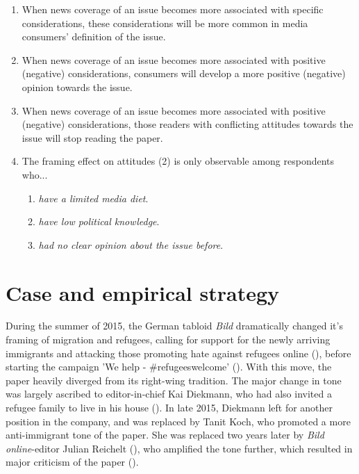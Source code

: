 \documentclass{article}
\begin{document}
\begin{enumerate}
    \item{When news coverage of an issue becomes more associated with specific considerations, these considerations will be more common in media consumers' definition of the issue.}
    \item{When news coverage of an issue becomes more associated with positive (negative) considerations, consumers will develop a more positive (negative) opinion towards the issue.}
    \item{When news coverage of an issue becomes more associated with positive (negative) considerations, those readers with conflicting attitudes towards the issue will stop reading the paper.}
    \item{The framing effect on attitudes (2) is only observable among respondents who...}
    \begin{enumerate}
        \item{\textit{have a limited media diet}.}
        \item{\textit{have low political knowledge}.}
        \item{\textit{had no clear opinion about the issue before}.}
    \end{enumerate}
\end{enumerate}


\section{Case and empirical strategy}


During the summer of 2015, the German tabloid \textit{Bild} dramatically changed it's framing of migration and refugees, calling for support for the newly arriving immigrants and attacking those promoting hate against refugees online (\cite{Bild2015Pranger, TagesspiegelBildPranger}), before starting the campaign 'We help - \#refugeeswelcome' (\cite{BildRefugeesWelcome}). With this move, the paper heavily diverged from its right-wing tradition. The major change in tone was largely ascribed to editor-in-chief Kai Diekmann, who had also invited a refugee family to live in his house (\cite{BR2015Diekmann}). In late 2015, Diekmann left for another position in the company, and was replaced by Tanit Koch, who promoted a more anti-immigrant tone of the paper. She was replaced two years later by \textit{Bild online}-editor Julian Reichelt (\cite{Spiegel2018Koch}), who amplified the tone further, which resulted in major criticism of the paper (\cite{Niggemeyer2018Bild, DLF2018Reichelt}).
\end{document}

